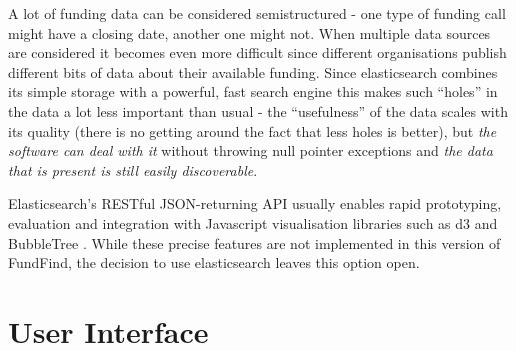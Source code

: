  A lot of funding data can be considered semistructured - one type of funding call might have a closing date, another one might not. When multiple data sources are considered it becomes even more difficult since different organisations publish different bits of data about their available funding. Since elasticsearch combines its simple storage with a powerful, fast search engine this makes such ``holes'' in the data a lot less important than usual - the ``usefulness'' of the data scales with its quality (there is no getting around the fact that less holes is better), but \emph{the software can deal with it} without throwing null pointer exceptions and \emph{the data that is present is still easily discoverable}.
 
 
 Elasticsearch's RESTful JSON-returning API usually enables rapid prototyping, evaluation and integration with Javascript visualisation libraries such as d3 \cite{d3} and BubbleTree \cite{bubbletree}. While these precise features are not implemented in this version of FundFind, the decision to use elasticsearch leaves this option open.
 
 

\section{User Interface}
